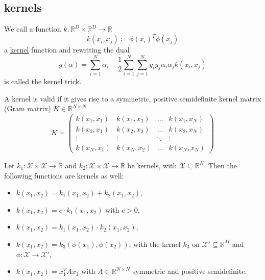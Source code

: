 \documentclass[12 pt]{article}        	%
\begin{document}
\subsection{kernels}

\begin{defi}
    We call a function $ k \colon \mathbb{ R }^D \times \mathbb{ R }^D \to \mathbb{ R } $
    \[
        k ( x_i , x_j ) \coloneqq \phi ( x_i )^T \phi ( x_j ) 
    \]
    a \underline{kernel} function and rewriting the dual 
    \[
        g ( \alpha ) = \sum_{ i = 1 }^N \alpha_i - \frac{ 1 }{ 2 } \sum_{ i = 1 }^N \sum_{ j = 1 }^N y_i y_j \alpha_i \alpha_j k  ( x_i , x_j ) 
    \]
    is called the kernel trick.
\end{defi}

\begin{thm}
    A kernel is valid if it gives rise to a symmetric, positive semidefinite kernel matrix (Gram matrix) $ K \in \mathbb{ R }^{ N \times N } $
    \[
        K = 
        \begin{pmatrix}
            k ( x_1 , x_1 ) & k ( x_1, x_2 ) & \dotsc & k ( x_1 , x_N ) 
            \\
            k ( x_2 , x_1 ) & k (x_2 , x_2 ) & \dotsc & k ( x_2 , x_N ) 
            \\
            \vdots & \vdots & \ddots & \vdots 
            \\
            k ( x_N , x_1 ) & k ( x_N , x_2 ) & \dotsc & k ( x_N , x_N ) 
        \end{pmatrix}   
    \]
\end{thm}

\begin{lem}
    Let $ k_1 \colon \mathcal{ X } \times \mathcal{ X } \to \mathbb{ R } $ and $ k_2 \colon \mathcal{ X } \times \mathcal{ X } \to \mathbb{ R }$ be kernels, with $ \mathcal{ X } \subseteq \mathbb{ R }^N $. 
    Then the following functions are kernels as well:
    \begin{itemize}
        \item 
        $ k ( x_1 , x_2 ) = k_1 ( x_1 , x_2 ) + k_2 ( x_1 , x_2 ) $,

        \item 
        $k ( x_1 , x_2 ) = c \cdot k_1 ( x_1 , x_2 ) $ with $ c > 0 $,

        \item 
        $ k ( x_1 , x_2 ) = k_1 ( x_1 , x_2 ) \cdot k_2 ( x_1 , x_2 ) $,

        \item 
        $ k (x_1 , x_2 ) = k_3 ( \phi ( x_1 ) , \phi ( x_2 ) ) $, with the kernel $ k_3 $ on $ \mathcal{ X }' \subseteq \mathbb{ R }^M $ and $ \phi \colon \mathcal{ X } \to \mathcal{ X }'$,

        \item 
        $ k ( x_1 , x_2 ) = x_1^T A x_2 $ with $ A \in \mathbb{ R }^{ N \times N } $ symmetric and positive semidefinite.
    \end{itemize}
\end{lem}
\end{document}

